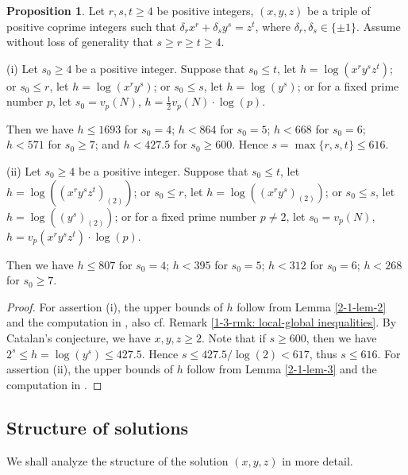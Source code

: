 \documentclass[a4paper, 12pt]{article}
\numberwithin{equation}{section}
\theoremstyle{definition}
\newtheorem{prop}[thm]{Proposition}
\begin{document}
\begin{prop} \label{2-1-prop-bound}
Let $r,s,t \ge 4$ be positive integers, $(x,y,z)$ be a triple of positive coprime integers such that $\delta_r x^r + \delta_s y^s =  z^t$, where $\delta_r,\delta_s \in \{\pm 1\}$.
Assume without loss of generality that $s\ge r\ge t\ge 4$.

(i) Let $s_0 \ge 4$ be a positive integer. 
Suppose that $s_0 \le t$, let $h = \log(x^{r}y^{s}z^{t})$; 
or $s_0 \le r$, let $h = \log(x^{r}y^{s})$; 
or $s_0 \le s$, let $h = \log(y^{s})$;
or for a fixed prime number $p$, let $s_0 = v_p(N)$, $h =  \frac{1}{2} v_p(N) \cdot \log(p)$.

Then we have $h\le 1693$ for $s_0 = 4$;
$h < 864$ for $s_0 = 5$;
$h < 668$ for $s_0 = 6$;
$h < 571$ for $s_0 \ge 7$;
and $h < 427.5$ for $s_0\ge 600$.
Hence $s = \max\{r,s,t\} \le 616$.

(ii) Let $s_0 \ge 4$ be a positive integer. 
Suppose that $s_0 \le t$, let $h = \log( (x^{r}y^{s}z^{t})_{(2)} )$; 
or $s_0 \le r$, let $h = \log( (x^{r}y^{s})_{(2)} )$; 
or $s_0 \le s$, let $h = \log( (y^{s})_{(2)} )$;
or for a fixed prime number $p\neq 2$, let $s_0 = v_p(N)$, $h =  v_p(x^r y^s z^t) \cdot \log(p)$.

Then we have $h\le 807$ for $s_0 = 4$;
$h < 395$ for $s_0 = 5$;
$h < 312$ for $s_0 = 6$;
$h < 268$ for $s_0 \ge 7$.
\end{prop}
\begin{proof}
For assertion (i), the upper bounds of $h$ follow from Lemma \ref{2-1-lem-2} and the computation in \cite{code_of_zpzhou}, also cf. Remark \ref{1-3-rmk:  local-global inequalities}. 
By Catalan's conjecture, we have $x,y,z \ge 2$.
Note that if $s\ge 600$, then we have $2^s \le h = \log(y^s) \le 427.5$.  
Hence $s \le 427.5 / \log(2) < 617$, thus $s\le 616$.
For assertion (ii), the upper bounds of $h$ follow from Lemma \ref{2-1-lem-3} and the computation in \cite{code_of_zpzhou}.
\end{proof}


\subsection{Structure of solutions}
We shall analyze the structure of the solution $(x,y,z)$ in more detail.
\end{document}

